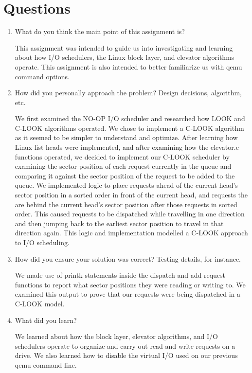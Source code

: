 \documentclass[letterpaper,10pt,fleqn]{article}
\begin{document}
\section*{Questions}
\begin{enumerate}
\item What do you think the main point of this assignment is?

This assignment was intended to guide us into investigating and learning about how I/O schedulers, the Linux block layer, and elevator algorithms operate. This assignment is also intended to better familiarize us with qemu command options.

\item How did you personally approach the problem? Design decisions, algorithm, etc. 

We first examined the NO-OP I/O scheduler and researched how LOOK and C-LOOK algorithms operated. We chose to implement a C-LOOK algorithm as it seemed to be simpler to understand and optimize. After learning how Linux list heads were implemented, and after examining how the elevator.c functions operated, we decided to implement our C-LOOK scheduler by examining the sector position of each request currently in the queue and comparing it against the sector position of the request to be added to the queue. We implemented logic to place requests ahead of the current head's sector position in a sorted order in front of the current head, and requests the are behind the current head's sector position after those requests in sorted order. This caused requests to be dispatched while travelling in one direction and then jumping back to the earliest sector position to travel in that direction again. This logic and implementation modelled a C-LOOK approach to I/O scheduling.

\item How did you ensure your solution was correct? Testing details, for instance. 

We made use of printk statements inside the dispatch and add request functions to report what sector positions they were reading or writing to. We examined this output to prove that our requests were being dispatched in a C-LOOK model.

\item What did you learn? 

We learned about how the block layer, elevator algorithms, and I/O schedulers operate to organize and carry out read and write requests on a drive. We also learned how to disable the virtual I/O used on our previous qemu command line.


\end{enumerate}
\end{document}
